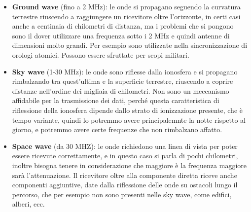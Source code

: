 \begin{itemize}
    \item \textbf{Ground wave} (fino a 2 MHz): le onde si propagano seguendo la curvatura terrestre riuscendo a raggiungere un ricevitore oltre l'orizzonte, in certi casi anche a centinaia di chilometri di distanza, ma i problemi che si pongono sono il dover utilizzare una frequenza sotto i 2 MHz e quindi antenne di dimensioni molto grandi. Per esempio sono utilizzate nella sincronizzazione di orologi atomici. Possono essere sfruttate per scopi militari.
    \item \textbf{Sky wave} (1-30 MHz): le onde sono riflesse dalla ionosfera e si propagano rimbalzando tra quest'ultima e la superficie terrestre, riuscendo a coprire distanze nell'ordine dei migliaia di chilometri. Non sono un meccanismo affidabile per la trasmissione dei dati, perché questa caratteristica di riflessione della ionosfera dipende dallo strato di ionizzazione presente, che è tempo variante, quindi lo potremmo avere principalemnte la notte rispetto al giorno, e potremmo avere certe frequenze che non rimbalzano affatto.
    \item \textbf{Space wave} (da 30 MHZ): le onde richiedono una linea di vista per poter essere ricevute correttamente, e in questo caso si parla di pochi chilometri, inoltre bisogna tenere in considerazione che maggiore è la frequenza maggiore sarà l'attenuazione. Il ricevitore oltre alla componente diretta riceve anche componenti aggiuntive, date dalla riflessione delle onde su ostacoli lungo il percorso, che per esempio non sono presenti nelle sky wave, come edifici, alberi, ecc.
\end{itemize}




